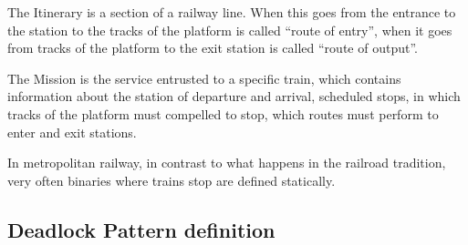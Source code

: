 \documentclass{ewic}
\begin{document}
			The Itinerary is a section of a railway line. When this goes from the entrance to the station to the tracks of the platform is called ``route of entry'', when it goes from tracks of the platform to the exit station is called ``route of output''.
			
			
			The Mission is the service entrusted to a specific train, which contains information about the station of departure and arrival, scheduled stops, in which tracks of the platform must compelled to stop, which routes must perform to enter and exit stations.
			 
			
			
			In metropolitan railway, in contrast to what happens in the railroad tradition, very often binaries where trains stop are defined statically.
			 
			
			
			
			 
			
			
			
			\subsection{Deadlock Pattern definition}\label{sec:deadlockpatterndefinition}
			
\end{document}
